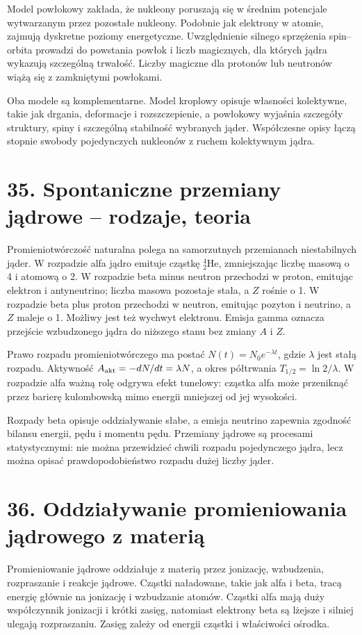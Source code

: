 \documentclass[11pt,a4paper,oneside]{report}
\begin{document}
Model powłokowy zakłada, że nukleony poruszają się w średnim potencjale wytwarzanym przez pozostałe nukleony. Podobnie jak elektrony w atomie, zajmują dyskretne poziomy energetyczne. Uwzględnienie silnego sprzężenia spin–orbita prowadzi do powstania powłok i liczb magicznych, dla których jądra wykazują szczególną trwałość. Liczby magiczne dla protonów lub neutronów wiążą się z zamkniętymi powłokami.

Oba modele są komplementarne. Model kroplowy opisuje własności kolektywne, takie jak drgania, deformacje i rozszczepienie, a powłokowy wyjaśnia szczegóły struktury, spiny i szczególną stabilność wybranych jąder. Współczesne opisy łączą stopnie swobody pojedynczych nukleonów z ruchem kolektywnym jądra.

\section{35. Spontaniczne przemiany jądrowe – rodzaje, teoria}
Promieniotwórczość naturalna polega na samorzutnych przemianach niestabilnych jąder. W rozpadzie alfa jądro emituje cząstkę \({}^4_2\mathrm{He}\), zmniejszając liczbę masową o 4 i atomową o 2. W rozpadzie beta minus neutron przechodzi w proton, emitując elektron i antyneutrino; liczba masowa pozostaje stała, a \(Z\) rośnie o 1. W rozpadzie beta plus proton przechodzi w neutron, emitując pozyton i neutrino, a \(Z\) maleje o 1. Możliwy jest też wychwyt elektronu. Emisja gamma oznacza przejście wzbudzonego jądra do niższego stanu bez zmiany \(A\) i \(Z\).

Prawo rozpadu promieniotwórczego ma postać \(N(t)=N_0e^{-\lambda t}\), gdzie \(\lambda\) jest stałą rozpadu. Aktywność \(A_{\rm akt}=-dN/dt=\lambda N\), a okres półtrwania \(T_{1/2}=\ln2/\lambda\). W rozpadzie alfa ważną rolę odgrywa efekt tunelowy: cząstka alfa może przeniknąć przez barierę kulombowską mimo energii mniejszej od jej wysokości.

Rozpady beta opisuje oddziaływanie słabe, a emisja neutrino zapewnia zgodność bilansu energii, pędu i momentu pędu. Przemiany jądrowe są procesami statystycznymi: nie można przewidzieć chwili rozpadu pojedynczego jądra, lecz można opisać prawdopodobieństwo rozpadu dużej liczby jąder.

\section{36. Oddziaływanie promieniowania jądrowego z materią}
Promieniowanie jądrowe oddziałuje z materią przez jonizację, wzbudzenia, rozpraszanie i reakcje jądrowe. Cząstki naładowane, takie jak alfa i beta, tracą energię głównie na jonizację i wzbudzanie atomów. Cząstki alfa mają duży współczynnik jonizacji i krótki zasięg, natomiast elektrony beta są lżejsze i silniej ulegają rozpraszaniu. Zasięg zależy od energii cząstki i właściwości ośrodka.
\end{document}
